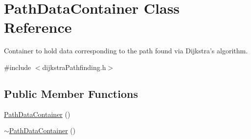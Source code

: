 \hypertarget{classPathDataContainer}{\section{Path\-Data\-Container Class Reference}
\label{classPathDataContainer}
}


Container to hold data corresponding to the path found via Dijkstra's algorithm.  




{\ttfamily \#include $<$dijkstra\-Pathfinding.\-h$>$}

\subsection*{Public Member Functions}
\begin{DoxyCompactItemize}
\item 
\hyperlink{classPathDataContainer_ad37b6c63127d1896eee0a911284f1744}{Path\-Data\-Container} ()
\item 
\hyperlink{classPathDataContainer_aaf5492fd2e31cf2fe4b2e753007ad143}{$\sim$\-Path\-Data\-Container} ()
\end{DoxyCompactItemize}
